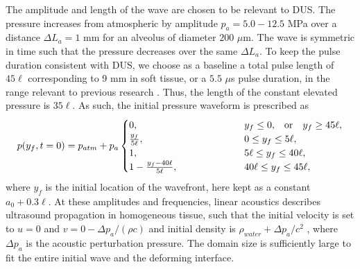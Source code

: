 The amplitude and length of the wave are chosen to be relevant to
\ac{DUS}.  The pressure increases from atmospheric by amplitude
$p_a=5.0-12.5$ MPa over a distance $\Delta L_a = 1$ mm for an alveolus
of diameter $200$ $\mu$m.  The wave is symmetric in time such that the
pressure decreases over the same $\Delta L_a$. To keep the pulse
duration consistent with DUS, we choose as a baseline a total pulse
length of $45\ell$ corresponding to 9 mm in soft tissue, or a $5.5$
$\mu$s pulse duration, in the range relevant to previous research
\citep{Child1990,OBrien2006b}. Thus, the length of the constant
elevated pressure is $35\ell$. As such, the initial pressure waveform
is prescribed as
\begin{align}
  \label{eq:p0}
  p(y_f,t=0) = p_{atm} + p_a %
    \begin{cases}
      0,&y_f\leq0 ,\quad$or$\quad y_f\geq45\ell,\\%
      \frac{y_f}{5\ell},&0\leq y_f\leq5\ell,\\%
      1,&5\ell\leq y_f\leq40\ell,\\%
      1-\frac{y_f-40\ell}{5\ell},\qquad\qquad\qquad&40\ell\leq y_f\leq45\ell,%
  \end{cases}%
\end{align}
where $y_f$ is the initial location of the wavefront, here kept as a
constant $a_0+0.3\ell$. At these amplitudes and frequencies, linear
acoustics describes ultrasound propagation in homogeneous tissue, such
that the initial velocity is set to $u=0$ and
$v=0-\Delta p_a / (\rho c)$ and initial density is
$\rho_{water} + \Delta p_a / c^2$ \cite{Anderson1990}, where
$\Delta p_a$ is the acoustic perturbation pressure. The domain size is
sufficiently large to fit the entire initial wave and the deforming
interface.


